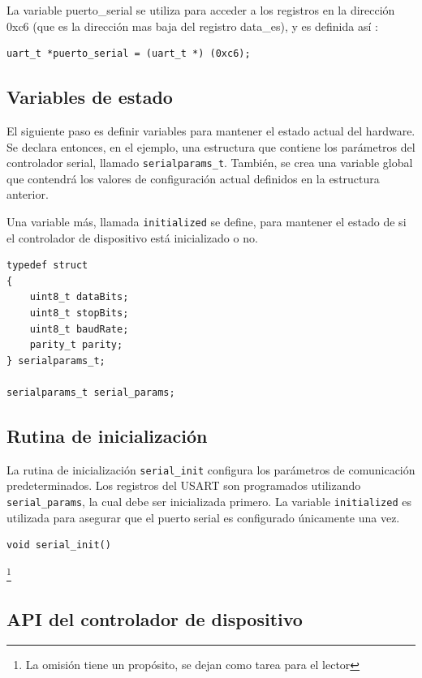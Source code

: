 \documentclass[output=paper, 
colorlinks,
citecolor=brown,
newtxmath
]{langscibook}
\begin{document}
La variable puerto\_serial se utiliza para acceder a los registros
en la dirección 0xc6 (que es la dirección mas baja del registro data\_es),
y es definida así :

\begin{verbatim}
uart_t *puerto_serial = (uart_t *) (0xc6);
\end{verbatim}


\subsection {Variables de estado}

El siguiente paso es definir variables para mantener el estado actual
del hardware. Se declara entonces, en el ejemplo, una estructura
que contiene los parámetros del controlador serial, llamado \texttt{serialparams\_t}.
También, se crea una variable global que contendrá los valores 
de configuración actual definidos en la estructura anterior.

Una variable más, llamada \texttt{initialized} se define, para mantener el estado 
de si el 
controlador de dispositivo está inicializado o no.

\begin{verbatim}
typedef struct
{
    uint8_t dataBits;
    uint8_t stopBits;
    uint8_t baudRate;
    parity_t parity;
} serialparams_t;

serialparams_t serial_params;
\end{verbatim}


\subsection {Rutina de inicialización}

La rutina de inicialización \texttt{serial\_init} configura los parámetros de comunicación
predeterminados.
Los registros del USART son programados utilizando \texttt{serial\_params}, la cual
debe ser inicializada primero.
La variable \texttt{initialized} es utilizada para asegurar que el puerto
serial es configurado únicamente una vez.


\begin{verbatim}
void serial_init()
\end{verbatim}
\footnote{La omisión tiene un propósito, se dejan como tarea para el lector}


\subsection {API del controlador de dispositivo}
\end{document}
